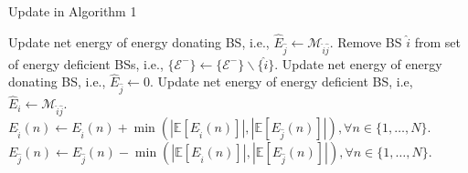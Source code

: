 \documentclass[10pt, letter,twocolumn]{IEEEtran}
\begin{document}
\begin{algorithm}
\small
\renewcommand{\thealgorithm}{1b}
\caption{Update in Algorithm 1}
\label{alg1:update}
\begin{algorithmic}[1]
\State Update net energy of energy donating BS, i.e., $\hat{E}_{\hat{j}} \gets \mathcal{M}_{\hat{i}\hat{j}}$.
\State Remove BS $\hat{i}$ from set of energy deficient BSs, i.e., $\{\mathcal{E}^{-}\} \gets \{\mathcal{E}^{-}\}\backslash \{\hat{i}\}$.
\Else
\State Update net energy of energy donating BS, i.e., $\hat{E}_{\hat{j}} \gets 0$.
\State Update net energy of energy deficient BS, i.e, $\hat{E}_{i} \gets \mathcal{M}_{\hat{i}\hat{j}}$.
\EndIf
\EndProcedure
{}
\State $E_{\hat{i}}(n) \gets E_{\hat{i}}(n) + \min(|\mathbb{E}[E_{\hat{i}}(n)]|,|\mathbb{E}[E_{\hat{j}}(n)]|), \forall n \in \{1,\ldots,N\}$.
\State $E_{\hat{j}}(n) \gets E_{\hat{j}}(n) - \min(|\mathbb{E}[E_{\hat{i}}(n)]|,|\mathbb{E}[E_{\hat{j}}(n)]|), \forall n \in \{1,\ldots,N\}$.
\EndProcedure
\end{algorithmic}
\end{algorithm}
\normalsize
\end{document}
